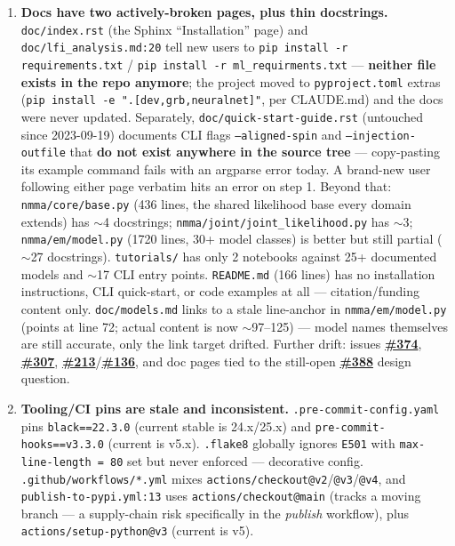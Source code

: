 \documentclass[10pt]{article}
\newcommand{\code}[1]{\texttt{#1}}
\begin{document}
\begin{enumerate}
\item \textbf{Docs have two actively-broken pages, plus thin docstrings.}
  \code{doc/index.rst} (the Sphinx ``Installation'' page) and
  \code{doc/lfi\_analysis.md:20} tell new users to
  \code{pip install -r requirements.txt} / \code{pip install -r ml\_requirments.txt}
  --- \textbf{neither file exists in the repo anymore}; the project moved to
  \code{pyproject.toml} extras (\code{pip install -e ".[dev,grb,neuralnet]"}, per
  CLAUDE.md) and the docs were never updated. Separately,
  \code{doc/quick-start-guide.rst} (untouched since 2023-09-19) documents CLI flags
  \code{--aligned-spin} and \code{--injection-outfile} that \textbf{do not exist
  anywhere in the source tree} --- copy-pasting its example command fails with an
  argparse error today. A brand-new user following either page verbatim hits an
  error on step 1. Beyond that: \code{nmma/core/base.py} (436 lines, the shared
  likelihood base every domain extends) has $\sim$4 docstrings;
  \code{nmma/joint/joint\_likelihood.py} has $\sim$3; \code{nmma/em/model.py} (1720
  lines, 30+ model classes) is better but still partial ($\sim$27 docstrings).
  \code{tutorials/} has only 2 notebooks against 25+ documented models and
  $\sim$17 CLI entry points. \code{README.md} (166 lines) has no installation
  instructions, CLI quick-start, or code examples at all --- citation/funding
  content only. \code{doc/models.md} links to a stale line-anchor in
  \code{nmma/em/model.py} (points at line 72; actual content is now $\sim$97--125)
  --- model names themselves are still accurate, only the link target drifted.
  Further drift: issues \textbf{\href{https://github.com/nuclear-multimessenger-astronomy/nmma/issues/374}{\#374}}, \textbf{\href{https://github.com/nuclear-multimessenger-astronomy/nmma/issues/307}{\#307}}, \textbf{\href{https://github.com/nuclear-multimessenger-astronomy/nmma/issues/213}{\#213}}/\textbf{\href{https://github.com/nuclear-multimessenger-astronomy/nmma/issues/136}{\#136}},
  and doc pages tied to the still-open \textbf{\href{https://github.com/nuclear-multimessenger-astronomy/nmma/issues/388}{\#388}} design question.

\item \textbf{Tooling/CI pins are stale and inconsistent.}
  \code{.pre-commit-config.yaml} pins \code{black==22.3.0} (current stable is
  24.x/25.x) and \code{pre-commit-hooks==v3.3.0} (current is v5.x). \code{.flake8}
  globally ignores \code{E501} with \code{max-line-length = 80} set but never
  enforced --- decorative config. \code{.github/workflows/*.yml} mixes
  \code{actions/checkout@v2}/\code{@v3}/\code{@v4}, and
  \code{publish-to-pypi.yml:13} uses \code{actions/checkout@main} (tracks a moving
  branch --- a supply-chain risk specifically in the \emph{publish} workflow), plus
  \code{actions/setup-python@v3} (current is v5).


\end{enumerate}
\end{document}
